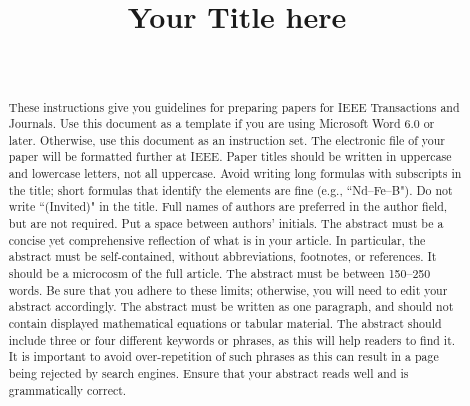 \documentclass{IEEEtran}
\begin{document}
%
\title{Your Title here}


\author{ \\
 }
 
\maketitle

\begin{abstract}
These instructions give you guidelines for preparing papers for IEEE Transactions and Journals. Use this 
document as a template if you are using Microsoft Word 6.0 or later. Otherwise, use this document as an 
instruction set. The electronic file of your paper will be formatted further at IEEE. Paper titles should 
be written in uppercase and lowercase letters, not all uppercase. Avoid writing long formulas with subscripts 
in the title; short formulas that identify the elements are fine (e.g., ``Nd–Fe–B"). Do not write ``(Invited)"
in the title. Full names of authors are preferred in the author field, but are not required. Put a space 
between authors' initials. The abstract must be a concise yet comprehensive reflection of what is in your 
article. In particular, the abstract must be self-contained, without abbreviations, footnotes, or references. 
It should be a microcosm of the full article. The abstract must be between 150–250 words. Be sure that you 
adhere to these limits; otherwise, you will need to edit your abstract accordingly. The abstract must be 
written as one paragraph, and should not contain displayed mathematical equations or tabular material. 
The abstract should include three or four different keywords or phrases, as this will help readers to find 
it. It is important to avoid over-repetition of such phrases as this can result in a page being rejected by 
search engines. Ensure that your abstract reads well and is grammatically correct.
\end{abstract}
\end{document}
